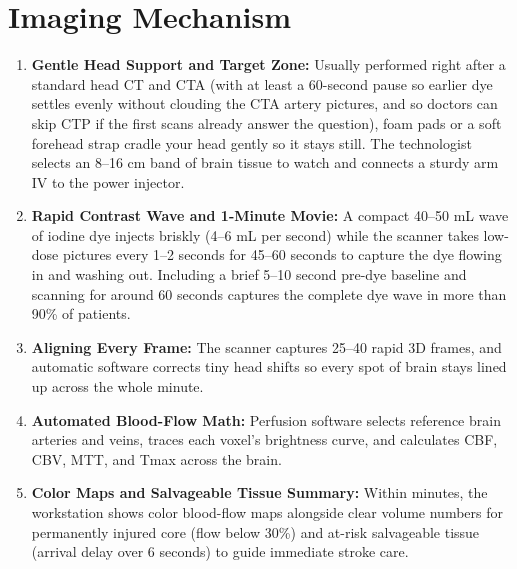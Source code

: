 \section{Imaging Mechanism}
\begin{enumerate}
    \item \textbf{Gentle Head Support and Target Zone:} Usually performed right after a standard head CT and CTA (with at least a 60-second pause so earlier dye settles evenly without clouding the CTA artery pictures, and so doctors can skip CTP if the first scans already answer the question), foam pads or a soft forehead strap cradle your head gently so it stays still. The technologist selects an 8--16 cm band of brain tissue to watch and connects a sturdy arm IV to the power injector.
    \item \textbf{Rapid Contrast Wave and 1-Minute Movie:} A compact 40--50 mL wave of iodine dye injects briskly (4--6 mL per second) while the scanner takes low-dose pictures every 1--2 seconds for 45--60 seconds to capture the dye flowing in and washing out. Including a brief 5--10 second pre-dye baseline and scanning for around 60 seconds captures the complete dye wave in more than 90\% of patients.
    \item \textbf{Aligning Every Frame:} The scanner captures 25--40 rapid 3D frames, and automatic software corrects tiny head shifts so every spot of brain stays lined up across the whole minute.
    \item \textbf{Automated Blood-Flow Math:} Perfusion software selects reference brain arteries and veins, traces each voxel's brightness curve, and calculates CBF, CBV, MTT, and Tmax across the brain.
    \item \textbf{Color Maps and Salvageable Tissue Summary:} Within minutes, the workstation shows color blood-flow maps alongside clear volume numbers for permanently injured core (flow below 30\%) and at-risk salvageable tissue (arrival delay over 6 seconds) to guide immediate stroke care.
\end{enumerate}


